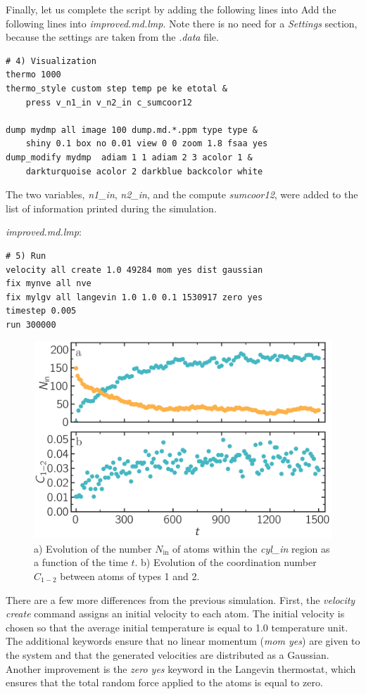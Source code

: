 \documentclass[9pt,tutorial]{livecoms}
\begin{document}
Finally, let us complete the script by adding the following lines into
Add the following lines into \textit{improved.md.lmp}.  Note there is no
need for a \textit{Settings} section, because the settings are taken
from the \textit{.data} file.
\begin{lstlisting}
# 4) Visualization
thermo 1000
thermo_style custom step temp pe ke etotal &
    press v_n1_in v_n2_in c_sumcoor12

dump mydmp all image 100 dump.md.*.ppm type type &
    shiny 0.1 box no 0.01 view 0 0 zoom 1.8 fsaa yes
dump_modify mydmp  adiam 1 1 adiam 2 3 acolor 1 &
    darkturquoise acolor 2 darkblue backcolor white
\end{lstlisting}
The two variables, \textit{n1\_in}, \textit{n2\_in}, and the compute
\textit{sumcoor12}, were added to the list of information printed during
the simulation.

\textit{improved.md.lmp}:
\begin{lstlisting}
# 5) Run
velocity all create 1.0 49284 mom yes dist gaussian
fix mynve all nve
fix mylgv all langevin 1.0 1.0 0.1 1530917 zero yes
timestep 0.005
run 300000
\end{lstlisting}

\begin{figure}
\centering
\includegraphics[width=\linewidth]{LJ-mixing}
\caption{a) Evolution of the number $N_\text{in}$ of atoms within the
\textit{cyl\_in} region as a function of the time $t$. b) Evolution of
the coordination number $C_{1-2}$ between atoms of types 1 and 2.}
\label{fig:mixing}
\end{figure}

There are a few more differences from the previous simulation.  First,
the \textit{velocity create} command assigns an initial velocity to each
atom.  The initial velocity is chosen so that the average initial
temperature is equal to 1.0 temperature unit.  The additional keywords
ensure that no linear momentum (\textit{mom yes}) are given to the
system and that the generated velocities are distributed as a Gaussian.
Another improvement is the \textit{zero yes} keyword in the Langevin
thermostat, which ensures that the total random force applied to the
atoms is equal to zero.
\end{document}
